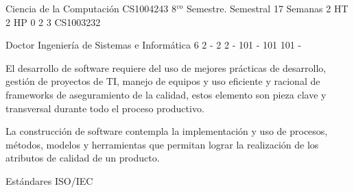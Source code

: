 \documentclass[a4paper,8pt]{article}
\begin{document}
\setNombreProfesor{}
\setGradoProfesorAbreviado{}
\sylabusHeader

\academicaTable
{Ciencia de la Computación} %
{CS1004243} %
{8$^{vo}$ Semestre.} %
{Semestral} %
{17 Semanas} %
{2 HT} %
{2 HP} %
{0} %
{}  %
{2} %
{3} %
{CS1003232} %

\administrativaTable
{Doctor} %
{Ingeniería de Sistemas e Informática} %
{6} %
{2} %
{-} %
{2} %
{2} %
{-} %
{101} %
{-} %
{101} %
{101} %
{-} %


\begin{fundamentacion}
El desarrollo de software requiere del uso de mejores prácticas de desarrollo, gestión de proyectos de TI, manejo de equipos 
y uso eficiente y racional de frameworks de aseguramiento de la calidad, estos elemento son pieza clave y transversal durante 
todo el proceso productivo.

La construcción de software contempla la implementación y uso de procesos, métodos, modelos y herramientas que permitan lograr 
la realización de los atributos de calidad de un producto.

\end{fundamentacion}

\begin{sumilla}
\item \SESoftwareEvolution
\item \SESoftwareProjectManagement
\item \SESoftwareProjectManagement
\item \SESoftwareProcesses
\item Estándares ISO/IEC

\end{sumilla}

\begin{competenciasAsignatura}
\item {}
\item {}
\item {}
\item {}
\item {}
\item {}
\item {}
\item {}
\item {}

\end{competenciasAsignatura}
\end{document}
